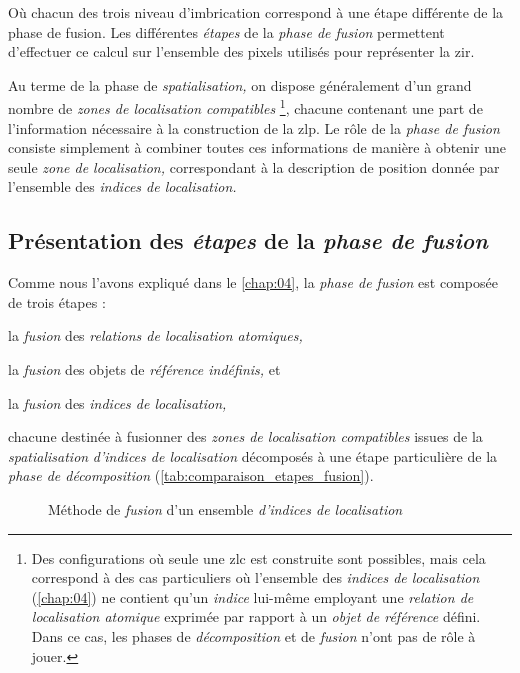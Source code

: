 Où chacun des trois niveau d'imbrication correspond à une étape
différente de la phase de fusion. Les différentes \emph{étapes} de la
\emph{phase de fusion} permettent d'effectuer ce calcul sur l'ensemble
des pixels utilisés pour représenter la \ac{zir}.

Au terme de la phase de \emph{spatialisation,} on dispose généralement
d'un grand nombre de \emph{zones de localisation compatibles}
\footnote{Des configurations où seule une \ac{zlc} est construite sont
  possibles, mais cela correspond à des cas particuliers où l'ensemble
  des \emph{indices de localisation} (\autoref{chap:04}) ne contient
  qu'un \emph{indice} lui-même employant une \emph{relation de
    localisation atomique} exprimée par rapport à un \emph{objet de
    référence} défini. Dans ce cas, les phases de \emph{décomposition}
  et de \emph{fusion} n'ont pas de rôle à jouer.}, chacune contenant
une part de l'information nécessaire à la construction de la
\ac{zlp}. Le rôle de la \emph{phase de fusion} consiste simplement à
combiner toutes ces informations de manière à obtenir une seule
\emph{zone de localisation,} correspondant à la description de
position donnée par l'ensemble des \emph{indices de localisation.}

\subsection{Présentation des \emph{étapes} de la \emph{phase de
    fusion}}

Comme nous l'avons expliqué dans le \autoref{chap:04}, la \emph{phase
  de fusion} est composée de trois étapes :
%
\begin{enumerate*}[label=(\arabic*)]
\item la \emph{fusion} des \emph{relations de localisation atomiques,}
\item la \emph{fusion} des objets de \emph{référence indéfinis,} et
\item la \emph{fusion} des \emph{indices de localisation,}
\end{enumerate*}
%
chacune destinée à fusionner des \emph{zones de localisation
  compatibles} issues de la \emph{spatialisation} \emph{d'indices de
  localisation} décomposés à une étape particulière de la \emph{phase
  de décomposition} (\autoref{tab:comparaison_etapes_fusion}).

\begin{figure}
  \centering
  
  \caption{Méthode de \emph{fusion} d'un ensemble \emph{d'indices de localisation}}
  \label{fig:methodo_fusion}
\end{figure}


